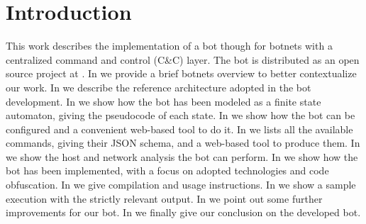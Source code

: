 \section{Introduction}
\label{sec:introduction}

This work describes the implementation of a bot though for botnets with a centralized command and control (C\&C) layer. The bot is distributed as an open source project at \cite{project-repo}.
In  we provide a brief botnets overview to better contextualize our work.
In  we describe the reference architecture adopted in the bot development.
In  we show how the bot has been modeled as a finite state automaton, giving the pseudocode of each state.
In  we show how the bot can be configured and a convenient web-based tool to do it.
In  we lists all the available commands, giving their JSON schema, and a web-based tool to produce them.
In  we show the host and network analysis the bot can perform.
In  we show how the bot has been implemented, with a focus on adopted technologies and code obfuscation.
In  we give compilation and usage instructions.
In  we show a sample execution with the strictly relevant output.
In  we point out some further improvements for our bot.
In  we finally give our conclusion on the developed bot.
